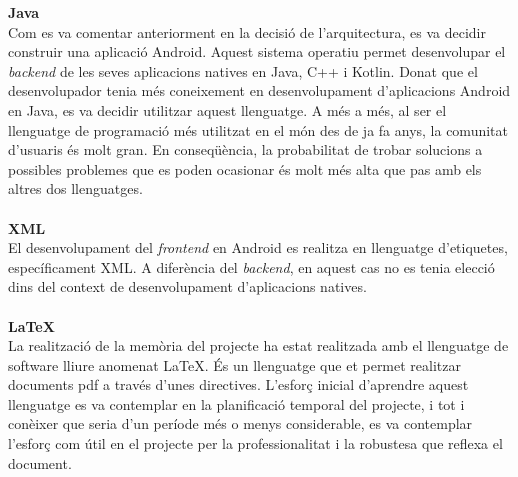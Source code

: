 \textbf{\large Java}\cite{java}\\
Com es va comentar anteriorment en la decisió de l'arquitectura, es va decidir construir una aplicació Android. Aquest sistema operatiu permet desenvolupar el \textit{backend} de les seves aplicacions natives en Java, C++ i Kotlin. Donat que el desenvolupador tenia més coneixement en desenvolupament d'aplicacions Android en Java, es va decidir utilitzar aquest llenguatge. A més a més, al ser el llenguatge de programació més utilitzat en el món des de ja fa anys, la comunitat d'usuaris és molt gran. En conseqüència, la probabilitat de trobar solucions a possibles problemes que es poden ocasionar és molt més alta que pas amb els altres dos llenguatges.
\\\\
\textbf{\large XML}\cite{xml}\\
El desenvolupament del \textit{frontend} en Android es realitza en llenguatge d'etiquetes, específicament XML. A diferència del \textit{backend}, en aquest cas no es tenia elecció dins del context de desenvolupament d'aplicacions natives.
\\\\
\textbf{\large \LaTeX}\cite{latex}\\
La realització de la memòria del projecte ha estat realitzada amb el llenguatge de software lliure anomenat \LaTeX. És un llenguatge que et permet realitzar documents pdf a través d'unes directives. L'esforç inicial d'aprendre aquest llenguatge es va contemplar en la planificació temporal del projecte, i tot i conèixer que seria d'un període més o menys considerable, es va contemplar l'esforç com útil en el projecte per la professionalitat i la robustesa que reflexa el document.
\\\\
